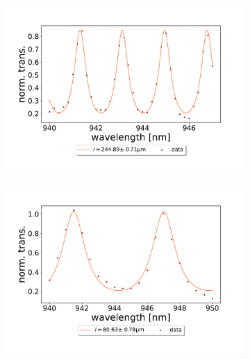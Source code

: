 \begin{figure}[h!]
\begin{subfigure}[b]{0.49\textwidth}
        \label{fig:323um_M3:M5_FSR_scan}
    \end{subfigure}
    \begin{subfigure}[b]{0.49\textwidth}
        \includegraphics[width=\textwidth]{figures/results/double fano fits/20250326/251um_M3:M5_FSR_scan.pdf}
        \caption{}
        \label{fig:251um_M3:M5_FSR_scan}
    \end{subfigure}
    \begin{subfigure}[b]{0.49\textwidth}
        \includegraphics[width=\textwidth]{figures/results/double fano fits/20250326/83um_M3:M5_FSR_scan.pdf}
        \caption{}
        \label{fig:83um_M3:M5_FSR_scan}
    \end{subfigure}
    \begin{subfigure}[b]{0.49\textwidth}

\end{subfigure}
\end{figure}
